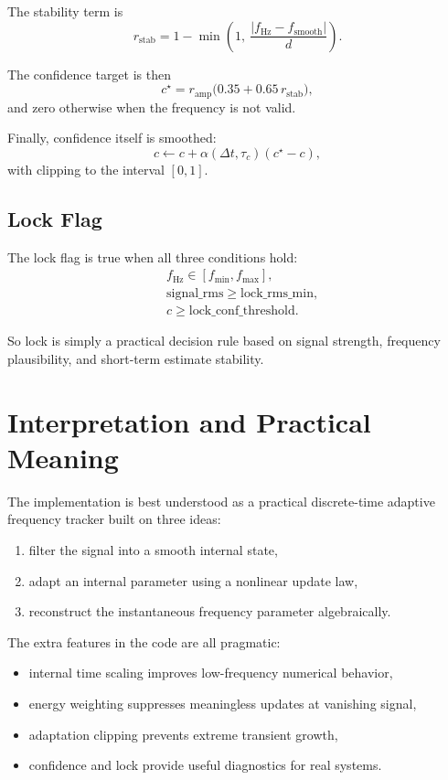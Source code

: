 \documentclass[conference]{IEEEtran}
\begin{document}
The stability term is
\begin{equation}
  r_{\text{stab}} =
  1 - \min\!\left(1,\ \frac{|f_{\text{Hz}}-f_{\text{smooth}}|}{d}\right).
\end{equation}

The confidence target is then
\begin{equation}
  c^\star =
  r_{\text{amp}}\bigl(0.35 + 0.65\,r_{\text{stab}}\bigr),
\end{equation}
and zero otherwise when the frequency is not valid.

Finally, confidence itself is smoothed:
\begin{equation}
  c \leftarrow c + \alpha(\Delta t,\tau_c)(c^\star - c),
\end{equation}
with clipping to the interval $[0,1]$.

\subsection{Lock Flag}

The lock flag is true when all three conditions hold:
\begin{align}
  &f_{\text{Hz}} \in [f_{\min},f_{\max}],\\
  &\text{signal\_rms} \ge \text{lock\_rms\_min},\\
  &c \ge \text{lock\_conf\_threshold}.
\end{align}

So lock is simply a practical decision rule based on signal strength,
frequency plausibility, and short-term estimate stability.

\section{Interpretation and Practical Meaning}

The implementation is best understood as a practical discrete-time adaptive
frequency tracker built on three ideas:

\begin{enumerate}
  \item filter the signal into a smooth internal state,
  \item adapt an internal parameter using a nonlinear update law,
  \item reconstruct the instantaneous frequency parameter algebraically.
\end{enumerate}

The extra features in the code are all pragmatic:
\begin{itemize}
  \item internal time scaling improves low-frequency numerical behavior,
  \item energy weighting suppresses meaningless updates at vanishing signal,
  \item adaptation clipping prevents extreme transient growth,
  \item confidence and lock provide useful diagnostics for real systems.
\end{itemize}
\end{document}
